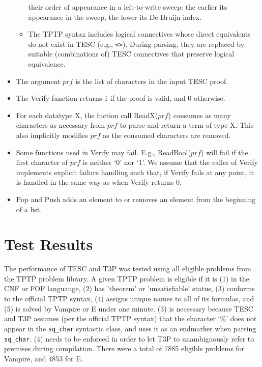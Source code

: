 \documentclass[12pt]{article}
\newcommand{\midtilde}{\raisebox{0.5ex}{\texttildelow}}
\newcommand{\Prf}[0]{\mathit{prf}}
\begin{document}
\begin{itemize}
\begin{itemize}
        their order of appearance in a left-to-write sweep: the earlier its appearance in the sweep, 
        the lower its De Bruijn index.
      \item The TPTP syntax includes logical connectives whose direct equivalents do not exist in TESC (e.g., \texttt{<\midtilde>}). During parsing, 
        they are replaced by suitable (combinations of) TESC connectives that preserve logical equivalence.
    \end{itemize}
  \item The argument $\Prf$ is the list of characters in the input TESC proof.
  \item The Verify function returns 1 if the proof is valid, and 0 otherwise.
  \item For each datatype $\mathrm{X}$, the fuction call ReadX($\Prf$) consumes as many characters as necessary from $\Prf$ 
    to parse and return a term of type $\mathrm{X}$. This also implicitly modifies $\Prf$ as the consumed characters are removed.
  \item Some functions used in Verify may fail. E.g., ReadBool($\Prf$) will fail if the first character of $\Prf$ is neither `0' nor `1'. We assume that the caller of Verify implements explicit failure handling such that, if Verify fails at any point, it is handled in the same way as when Verify returns 0.
  \item Pop and Push adds an element to or removes an element from the beginning of a list.
\end{itemize} 



\section{Test Results} \label{sec:results}

The performance of TESC and T3P was tested using all eligible problems from the TPTP problem library.
A given TPTP problem is eligible if it is (1) in the CNF or FOF languauge, (2) has 'theorem' or  
'unsatisfiable' status, (3) conforms to the official TPTP syntax, (4) assigns unique names to all of 
its formulas, and (5) is solved by Vampire or E under one minute. (3) is necessary because  
TESC and T3P assumes (per the official TPTP syntax) that the character `\%' does not appear in the
\verb|sq_char| syntactic class, and uses it as an endmarker when parsing \verb|sq_char|. 
(4) needs to be enforced in order to let T3P to unambiguously refer to premises during compilation.
There were a total of 7885 eligible problems for Vampire, and 4853 for E.
\end{document}
